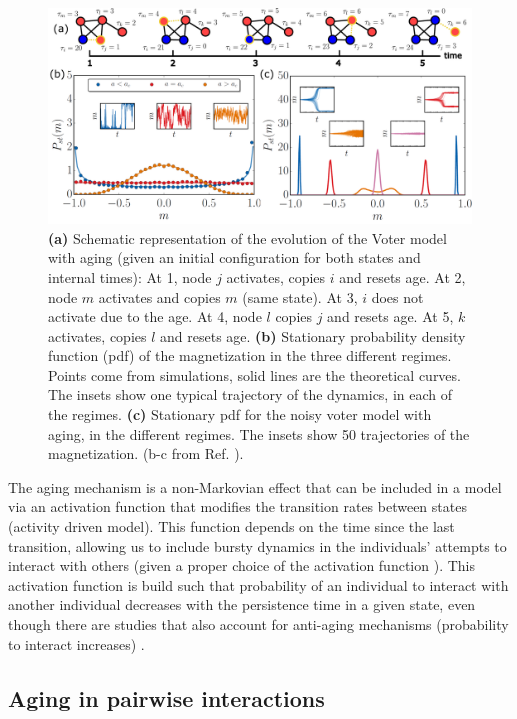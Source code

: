 \begin{figure}[t]
    \centering
    \captionsetup{font=sf}
    \includegraphics[width=\textwidth]{Figs/Introduction/aging_plot.pdf}
    \caption[Aging in the Voter model]{\textbf{(a)} Schematic representation of the evolution of the Voter model with aging (given an initial configuration for both states and internal times): At 1, node $j$ activates, copies $i$ and resets age. At 2, node $m$ activates and copies $m$ (same state). At 3, $i$ does not activate due to the age. At 4, node $l$ copies $j$ and resets age. At 5, $k$ activates, copies $l$ and resets age. \textbf{(b)} Stationary probability density function (pdf) of the magnetization in the three different regimes. Points come from simulations, solid lines are the theoretical curves. The insets show one typical trajectory of the dynamics, in each of the regimes. \textbf{(c)} Stationary pdf for the noisy voter model with aging, in the different regimes. The insets show 50 trajectories of the magnetization. (b-c from Ref. \cite{artime-2017}).}
    \label{fig:aging_pdf}
\end{figure}

The aging mechanism is a non-Markovian effect that can be included in a model via an activation function that modifies the transition rates between states (activity driven model). This function depends on the time since the last transition, allowing us to include bursty dynamics in the individuals' attempts to interact with others (given a proper choice of the activation function \cite{fernandez-gracia-2011}). This activation function is build such that probability of an individual to interact with another individual decreases with the persistence time in a given state, even though there are studies that also account for anti-aging mechanisms (probability to interact increases) \cite{peralta-2020C,chen-2020}.

\subsection{\label{sec:Aging in pairwise interactions} Aging in pairwise interactions}

